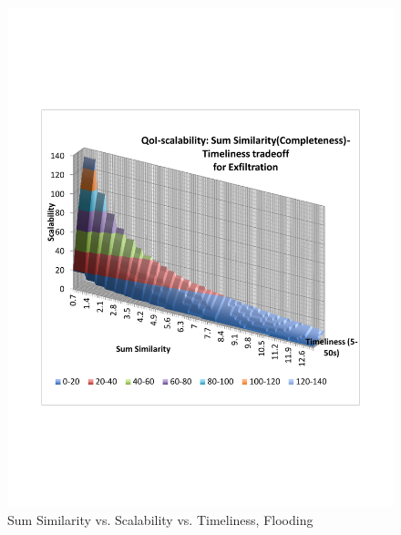 \begin{figure}
    \includegraphics[scale=0.35]{figures/topk_fld.pdf}
    \caption{Sum Similarity vs. Scalability vs. Timeliness, Flooding}
    \label{fig:3dplot2}
\end{figure}


